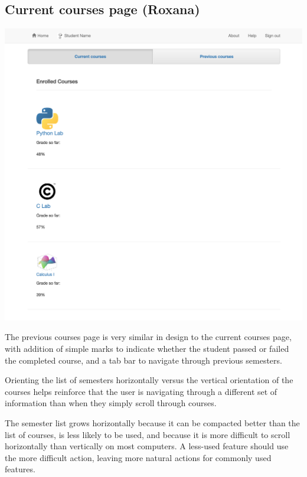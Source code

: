 \subsection{Current courses page (Roxana)}

\includegraphics[width=\textwidth]{screenshots/CurrentCourses.png}

The previous courses page is very similar in design to the current courses page, with addition of simple marks to indicate whether the student passed or failed the completed course, and a tab bar to navigate through previous semesters. 

Orienting the list of semesters horizontally versus the vertical orientation of the courses helps reinforce that the user is navigating through a different set of information than when they simply scroll through courses. 

The semester list grows horizontally because it can be compacted better than the list of courses, is less likely to be used, and because it is more difficult to scroll horizontally than vertically on most computers. A less-used feature should use the more difficult action, leaving more natural actions for commonly used features.